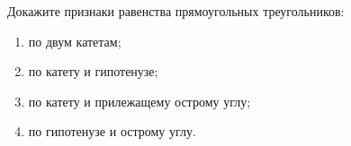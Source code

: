 \begin{ex}
	\begin{condition}
		Докажите признаки равенства прямоугольных треугольников:
		\begin{enumerate}[label=\asbuk*)]
			\item по двум катетам;
			\item по катету и гипотенузе;
			\item по катету и прилежащему острому углу;
			\item по гипотенузе и острому углу.
		\end{enumerate}
	\end{condition}
\end{ex}
